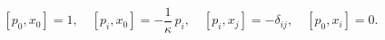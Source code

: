 \begin{equation}\label{6a}
  [p_0, x_0] = 1, \quad [p_i, x_0] =  -\frac{1}\kappa\, p_i, \quad [p_i, x_j] =-
 \delta_{ij} , \quad [p_0, x_i] =0.
\end{equation}


